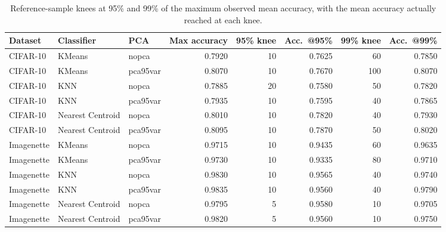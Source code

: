 \documentclass[sigconf,review,nonacm]{acmart}
\begin{document}
\begin{table}[t]
  \caption{Reference-sample knees at 95\% and 99\% of the maximum observed mean accuracy, with the mean accuracy actually reached at each knee.}
  \label{tab:sweet-spots}
  \centering
  \footnotesize
  \begin{tabular}{@{}lllrrrrr@{}}
    \toprule
    Dataset & Classifier & PCA & Max accuracy & 95\% knee & Acc.\ @95\% & 99\% knee & Acc.\ @99\% \\
    \midrule
    CIFAR-10 & KMeans & nopca & 0.7920 & 10 & 0.7625 & 60 & 0.7850 \\
    CIFAR-10 & KMeans & pca95var & 0.8070 & 10 & 0.7670 & 100 & 0.8070 \\
    CIFAR-10 & KNN & nopca & 0.7885 & 20 & 0.7580 & 50 & 0.7820 \\
    CIFAR-10 & KNN & pca95var & 0.7935 & 10 & 0.7595 & 40 & 0.7865 \\
    CIFAR-10 & Nearest Centroid & nopca & 0.8010 & 10 & 0.7820 & 40 & 0.7930 \\
    CIFAR-10 & Nearest Centroid & pca95var & 0.8095 & 10 & 0.7870 & 50 & 0.8020 \\
    Imagenette & KMeans & nopca & 0.9715 & 10 & 0.9435 & 60 & 0.9635 \\
    Imagenette & KMeans & pca95var & 0.9730 & 10 & 0.9335 & 80 & 0.9710 \\
    Imagenette & KNN & nopca & 0.9830 & 10 & 0.9565 & 40 & 0.9740 \\
    Imagenette & KNN & pca95var & 0.9835 & 10 & 0.9560 & 40 & 0.9790 \\
    Imagenette & Nearest Centroid & nopca & 0.9795 & 5 & 0.9580 & 10 & 0.9705 \\
    Imagenette & Nearest Centroid & pca95var & 0.9820 & 5 & 0.9560 & 10 & 0.9750 \\
    \bottomrule
  \end{tabular}
\end{table}
\end{document}
